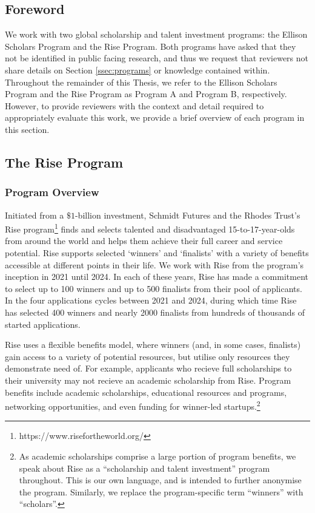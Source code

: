 \subsection{Foreword}
We work with two global scholarship and talent investment programs: the Ellison Scholars Program and the Rise Program. Both programs have asked that they not be identified in public facing research, and thus we request that reviewers not share details on Section \ref{ssec:programs} or knowledge contained within. Throughout the remainder of this Thesis, we refer to the Ellison Scholars Program and the Rise Program as Program A and Program B, respectively. However, to provide reviewers with the context and detail required to appropriately evaluate this work, we provide a brief overview of each program in this section.

\subsection{The Rise Program}\label{ssec:rise}
\subsubsection{Program Overview}
Initiated from a $\$1$-billion investment, Schmidt Futures and the Rhodes Trust's Rise program\footnote{https://www.risefortheworld.org/} finds and selects talented and disadvantaged 15-to-17-year-olds from around the world and helps them achieve their full career and service potential. Rise supports selected `winners' and `finalists' with a variety of benefits accessible at different points in their life. We work with Rise from the program's inception in 2021 until 2024. In each of these years, Rise has made a commitment to select up to 100 winners and up to 500 finalists from their pool of applicants. In the four applications cycles between 2021 and 2024, during which time Rise has selected 400 winners and nearly 2000 finalists from hundreds of thousands of started applications.

Rise uses a flexible benefits model, where winners (and, in some cases, finalists) gain access to a variety of potential resources, but utilise only resources they demonstrate need of. For example, applicants who recieve full scholarships to their university may not recieve an academic scholarship from Rise. Program benefits include academic scholarships, educational resources and programs, networking opportunities, and even funding for winner-led startups.\footnote{As academic scholarships comprise a large portion of program benefits, we speak about Rise as a ``scholarship and talent investment'' program throughout. This is our own language, and is intended to further anonymise the program. Similarly, we replace the program-specific term ``winners'' with ``scholars''.}

